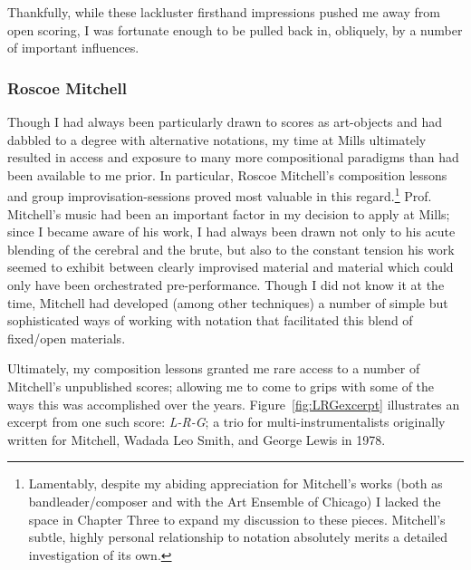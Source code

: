     Thankfully, while these lackluster firsthand impressions pushed me away from open scoring, I was fortunate enough to be pulled back in, obliquely, by a number of important influences. 

    \subsubsection{Roscoe Mitchell}
    Though I had always been particularly drawn to scores as art-objects and had dabbled to a degree with alternative notations, my time at Mills ultimately resulted in access and exposure to many more compositional paradigms than had been available to me prior. In particular, Roscoe Mitchell's composition lessons and group improvisation-sessions proved most valuable in this regard.\footnote{Lamentably, despite my abiding appreciation for Mitchell's works (both as bandleader/composer and with the Art Ensemble of Chicago) I lacked the space in Chapter Three to expand my discussion to these pieces. Mitchell's subtle, highly personal relationship to notation absolutely merits a detailed investigation of its own.} Prof. Mitchell's music had been an important factor in my decision to apply at Mills; since I became aware of his work, I had always been drawn not only to his acute blending of the cerebral and the brute, but also to the constant tension his work seemed to exhibit between clearly improvised material and material which could only have been orchestrated pre-performance. Though I did not know it at the time, Mitchell had developed (among other techniques) a number of simple but sophisticated ways of working with notation that facilitated this blend of fixed/open materials.
    
    Ultimately, my composition lessons granted me rare access to a number of Mitchell's unpublished scores; allowing me to come to grips with some of the ways this was accomplished over the years. Figure~\ref{fig:LRGexcerpt} illustrates an excerpt from one such score: \textit{L-R-G}; a trio for multi-instrumentalists originally written for Mitchell, Wadada Leo Smith, and George Lewis in 1978.  


